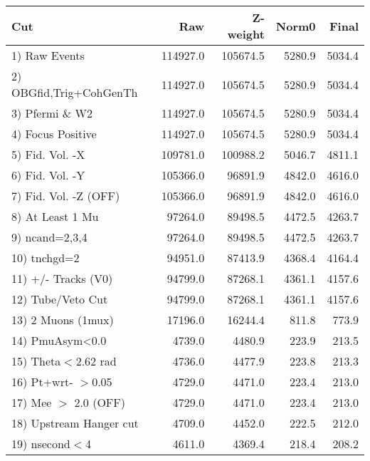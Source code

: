  \begin{table}[h!]\centering
 \begin{tabular}{||l||r|r|r|r||}
 \hline
 \hline
 Cut & Raw & Z-weight & Norm0 & Final \\
 \hline
  1) Raw Events           &    114927.0 &    105674.5 &      5280.9 &      5034.4 \\
  2) OBGfid,Trig+CohGenTh &    114927.0 &    105674.5 &      5280.9 &      5034.4 \\
  3) Pfermi \& W2         &    114927.0 &    105674.5 &      5280.9 &      5034.4 \\
  4) Focus Positive       &    114927.0 &    105674.5 &      5280.9 &      5034.4 \\
  5) Fid. Vol. -X         &    109781.0 &    100988.2 &      5046.7 &      4811.1 \\
  6) Fid. Vol. -Y         &    105366.0 &     96891.9 &      4842.0 &      4616.0 \\
  7) Fid. Vol. -Z (OFF)   &    105366.0 &     96891.9 &      4842.0 &      4616.0 \\
  8) At Least 1 Mu        &     97264.0 &     89498.5 &      4472.5 &      4263.7 \\
  9) ncand=2,3,4          &     97264.0 &     89498.5 &      4472.5 &      4263.7 \\
 10) tnchgd=2             &     94951.0 &     87413.9 &      4368.4 &      4164.4 \\
 11) +/- Tracks (V0)      &     94799.0 &     87268.1 &      4361.1 &      4157.6 \\
 12) Tube/Veto Cut        &     94799.0 &     87268.1 &      4361.1 &      4157.6 \\
 13) 2 Muons (1mux)       &     17196.0 &     16244.4 &       811.8 &       773.9 \\
 14) PmuAsym<0.0          &      4739.0 &      4480.9 &       223.9 &       213.5 \\
 15) Theta$<$2.62 rad     &      4736.0 &      4477.9 &       223.8 &       213.3 \\
 16) Pt+wrt- $>$0.05      &      4729.0 &      4471.0 &       223.4 &       213.0 \\
 17) Mee $>$ 2.0  (OFF)   &      4729.0 &      4471.0 &       223.4 &       213.0 \\
 18) Upstream Hanger cut  &      4709.0 &      4452.0 &       222.5 &       212.0 \\
 19) nsecond$<$4          &      4611.0 &      4369.4 &       218.4 &       208.2 \\

\end{tabular}
\end{table}

